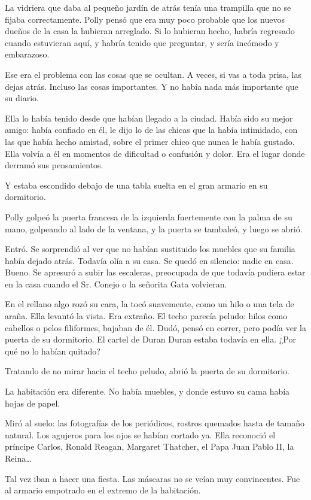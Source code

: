 La vidriera que daba al pequeño jardín de atrás tenía una trampilla que no se fijaba correctamente. Polly pensó que era muy poco probable que los nuevos dueños de la casa la hubieran arreglado. Si lo hubieran hecho, habría regresado cuando estuvieran aquí, y habría tenido que preguntar, y sería incómodo y embarazoso.

Ese era el problema con las cosas que se ocultan. A veces, si vas a toda prisa, las dejas atrás. Incluso las cosas importantes. Y no había nada más importante que su diario.

Ella lo había tenido desde que habían llegado a la ciudad. Había sido su mejor amigo: había confiado en él, le dijo lo de las chicas que la había intimidado, con las que había hecho amistad, sobre el primer chico que nunca le había gustado. Ella volvía a él en momentos de dificultad o confusión y dolor. Era el lugar donde derramó sus pensamientos.

Y estaba escondido debajo de una tabla suelta en el gran armario en su dormitorio.

Polly golpeó la puerta francesa de la izquierda fuertemente con la palma de su mano, golpeando al lado de la ventana, y la puerta se tambaleó, y luego se abrió.

Entró. Se sorprendió al ver que no habían sustituido los muebles que su familia había dejado atrás. Todavía olía a su casa. Se quedó en silencio: nadie en casa. Bueno. Se apresuró a subir las escaleras, preocupada de que todavía pudiera estar en la casa cuando el Sr. Conejo o la señorita Gata volvieran.

En el rellano algo rozó su cara, la tocó suavemente, como un hilo o una tela de araña. Ella levantó la vista. Era extraño. El techo parecía peludo: hilos como cabellos o pelos filiformes, bajaban de él. Dudó, pensó en correr, pero podía ver la puerta de su dormitorio. El cartel de Duran Duran estaba todavía en ella. ¿Por qué no lo habían quitado?

Tratando de no mirar hacia el techo peludo, abrió la puerta de su dormitorio.

La habitación era diferente. No había muebles, y donde estuvo su cama había hojas de papel.

Miró al suelo: las fotografías de los periódicos, rostros quemados hasta de tamaño natural. Los agujeros para los ojos se habían cortado ya. Ella reconoció el príncipe Carlos, Ronald Reagan, Margaret Thatcher, el Papa Juan Pablo II, la Reina\ldots{}

Tal vez iban a hacer una fiesta. Las máscaras no se veían muy convincentes. Fue al armario empotrado en el extremo de la habitación.

